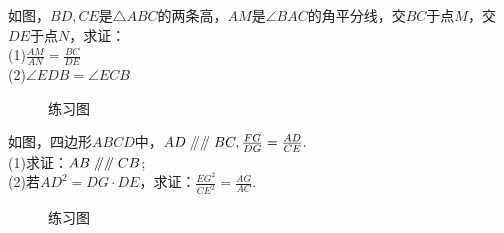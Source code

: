 \begin{problem}
如图，$BD,CE$是$\triangle ABC$的两条高，$AM$是$\angle BAC$的角平分线，交$BC$于点$M$，交$DE$于点$N$，求证：\\
(1)$\frac{AM}{AN}=\frac{BC}{DE}$ \\
(2)$\angle EDB=\angle ECB$ \\
\end{problem}
\begin{figure}[H]
    \centering
    \resizebox{4cm}{!}{}
    \caption{练习图}
\end{figure}
\begin{problem}
如图，四边形$ABCD$中，$AD\mathrel{/\mkern-5mu/} \mathrel{/\mkern-5mu/} BC,\frac{FG}{DG}=\frac{AD}{CE}.$ \\
(1)求证：$AB \mathrel{/\mkern-5mu/} \mathrel{/\mkern-5mu/} CB$; \\
(2)若$AD^2=DG·DE$，求证：$\frac{EG^2}{CE^2}=\frac{AG}{AC}.$ \\
\end{problem}
\begin{figure}[H]
    \centering
    \resizebox{4cm}{!}{}
    \caption{练习图}
\end{figure}
\clearpage
